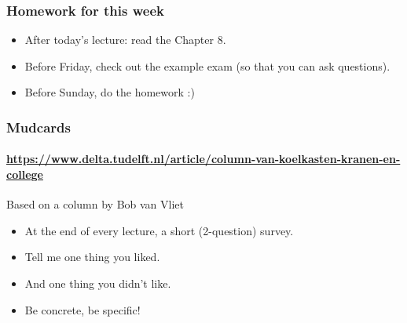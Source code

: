 
\begin{frame}
	\frametitle{Homework for this week}
	\begin{itemize}[<+->]
		\item \alert{After} today's lecture: read the Chapter 8.
		\item \alert{Before} Friday, check out the example exam (so that you can ask questions).
		\item \alert{Before} Sunday, do the homework :)
	\end{itemize}
\end{frame}

\begin{frame}
	\frametitle{Mudcards}
	\framesubtitle{\url{https://www.delta.tudelft.nl/article/column-van-koelkasten-kranen-en-college}}

	\begin{block}{Based on a column by Bob van Vliet}
		\begin{itemize}
			\item At the end of every lecture, a short (2-question) survey.
			\item Tell me one thing you liked.
			\item And one thing you didn't like.
			\item Be concrete, be specific!
		\end{itemize}
	\end{block}
\end{frame}


